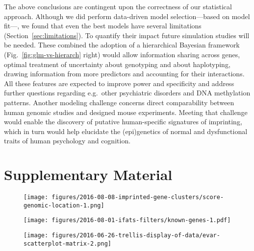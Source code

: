 \documentclass[letterpaper]{article}
\begin{document}
The above conclusions are contingent upon the correctness of our statistical
approach.  Although we did perform data-driven model selection---based on
model fit---, we found that even the best models have several limitations
(Section~\ref{sec:limitations}).  To quantify their impact future simulation
studies will be needed.  These combined the adoption of a hierarchical
Bayesian framework (Fig.~\ref{fig:glm-vs-hierarch} right) would allow
information sharing across genes, optimal treatment of uncertainty about
genotyping and about haplotyping, drawing information from more predictors and
accounting for their interactions.  All these features are expected to improve
power and specificity and address further questions regarding e.g.~other
psychiatric disorders and DNA methylation patterns.  Another modeling challenge
concerns direct comparability between human genomic studies and designed mouse
experiments.  Meeting that challenge would enable the discovery of putative
human-specific signatures of imprinting, which in turn would help elucidate
the (epi)genetics of normal and dysfunctional traits of human psychology and
cognition.




\newpage

\section{Supplementary Material}

\newpage


\setcounter{figure}{0}
\makeatletter 
\renewcommand{\thefigure}{S\@arabic\c@figure}
\makeatother

\begin{figure}
\begin{center}
\texttt{[image: figures/2016-08-08-imprinted-gene-clusters/score-genomic-location-1.png]}
\end{center}
\caption{}
\label{fig:clusters}
\end{figure}

\begin{figure}
\begin{center}
\texttt{[image: figures/2016-08-01-ifats-filters/known-genes-1.pdf]}
\caption{}
\label{fig:known-genes}
\end{center}
\end{figure}

\begin{figure}
\begin{center}
\texttt{[image: figures/2016-06-26-trellis-display-of-data/evar-scatterplot-matrix-2.png]}
\end{center}
\caption{}
\label{fig:predictor-associations}
\end{figure}
\end{document}
